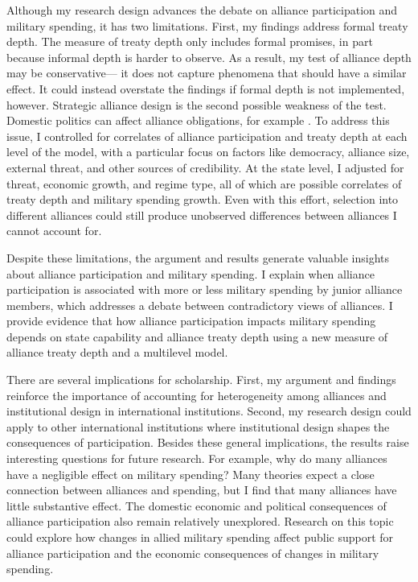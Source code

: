 \documentclass[12pt]{article}
\begin{document}
Although my research design advances the debate on alliance participation and military spending, it has two limitations. 
First, my findings address formal treaty depth. 
The measure of treaty depth only includes formal promises, in part because informal depth is harder to observe. 
As a result, my test of alliance depth may be conservative--- it does not capture phenomena that should have a similar effect. 
It could instead overstate the findings if formal depth is not implemented, however. 
Strategic alliance design is the second possible weakness of the test. 
Domestic politics can affect alliance obligations, for example \citep{Davis2004, Chibaetal2015}.   
To address this issue, I controlled for correlates of alliance participation and treaty depth at each level of the model, with a particular focus on factors like democracy, alliance size, external threat, and other sources of credibility.
At the state level, I adjusted for threat, economic growth, and regime type, all of which are possible correlates of treaty depth and military spending growth. 
Even with this effort, selection into different alliances could still produce unobserved differences between alliances I cannot account for. 


Despite these limitations, the argument and results generate valuable insights about alliance participation and military spending. 
I explain when alliance participation is associated with more or less military spending by junior alliance members, which addresses a debate between contradictory views of alliances.  
I provide evidence that how alliance participation impacts military spending depends on state capability and alliance treaty depth using a new measure of alliance treaty depth and a multilevel model. 


There are several implications for scholarship. 
First, my argument and findings reinforce the importance of accounting for heterogeneity among alliances and institutional design in international institutions.
Second, my research design could apply to other international institutions where institutional design shapes the consequences of participation.
Besides these general implications, the results raise interesting questions for future research. 
For example, why do many alliances have a negligible effect on military spending? 
Many theories expect a close connection between alliances and spending, but I find that many alliances have little substantive effect.
The domestic economic and political consequences of alliance participation also remain relatively unexplored.
Research on this topic could explore how changes in allied military spending affect public support for alliance participation and the economic consequences of changes in military spending.  
\end{document}
